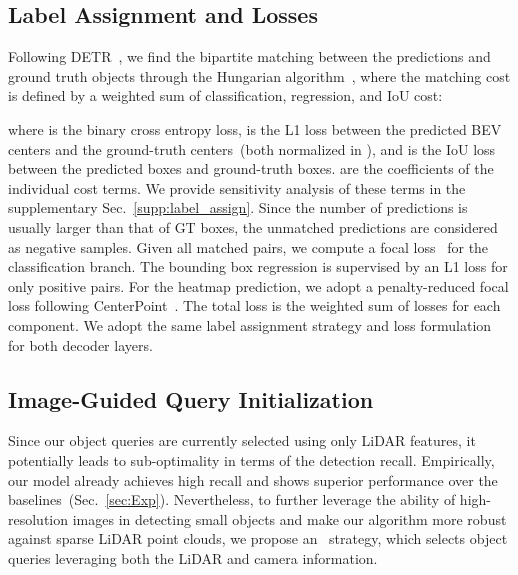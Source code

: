 \subsection{Label Assignment and Losses} 
\noindent Following DETR~\cite{misra20213detr}, we find the bipartite matching between {the} predictions and ground truth objects through {the} Hungarian algorithm~\cite{Kuhn1955TheHM}, where the matching cost is defined by a weighted sum of classification, regression, and IoU cost{:}

where  is the binary cross entropy loss,  is the L1 loss between {the} {predicted BEV centers and the ground-truth centers~(both normalized in ),} 
and  is the IoU loss~\cite{Zhou2019IoULF} between {the} predicted boxes and ground-truth boxes.  are the coefficients of the individual cost terms. We provide sensitivity {analysis} of these terms in the supplementary Sec.~\ref{supp:label_assign}. Since the number of predictions is usually larger than that of GT boxes, the unmatched predictions are considered as negative samples.
Given all matched pairs, we compute {a} focal loss~\cite{Lin2017FocalLF} for the classification branch. The bounding box regression is supervised by {an} L1 loss for only positive pairs. For the heatmap prediction, we adopt a penalty-reduced focal loss following CenterPoint~\cite{Yin2020Centerbased3O}. The total loss is the weighted sum of losses for each component. We adopt the same label assignment strategy and loss formulation for both decoder layers.











\subsection{Image-Guided Query Initialization}
\label{subsubsec:img_query} 
{Since} our object queries are {currently} selected using only
LiDAR features, {it potentially leads to} sub-optimality in terms of the detection recall.
Empirically, our model already achieves high recall and shows superior performance over {the} baselines~(Sec.~\ref{sec:Exp}). Nevertheless, to further leverage the ability of high-resolution images 
{in detecting} {small} objects and make our algorithm more robust {against} sparse LiDAR point clouds, we propose an \secondmodule~strategy{,} which selects object queries leveraging both {the} LiDAR and camera information.
 
